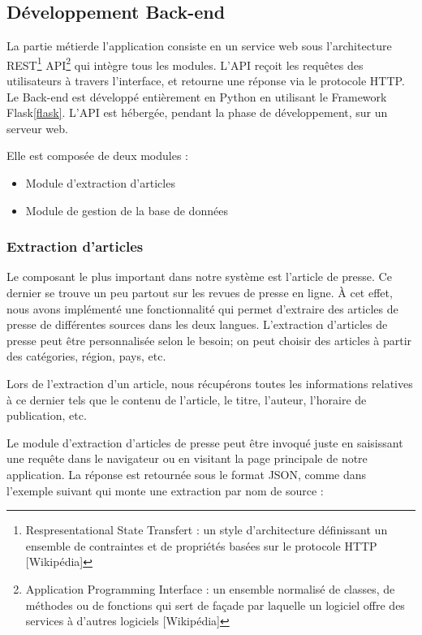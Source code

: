 \subsection{Développement Back-end}
La partie \textquotedbl métier\textquotedbl de l'application consiste en un service web sous l'architecture REST\footnote{Respresentational State Transfert : un style d'architecture définissant un ensemble de contraintes et de propriétés basées sur le protocole HTTP [Wikipédia]} API\footnote{Application Programming Interface : un ensemble normalisé de classes, de méthodes ou de fonctions qui sert de façade par laquelle un logiciel offre des services à d'autres logiciels [Wikipédia]} qui intègre tous les modules. L'API reçoit les requêtes des utilisateurs à travers l'interface, et retourne une réponse via le protocole HTTP. Le Back-end est développé entièrement en Python en utilisant le Framework Flask\autoref{flask}. L'API est hébergée, pendant la phase de développement, sur un serveur web. 

Elle est composée de deux modules :
\begin{itemize}
    \item Module d'extraction d'articles
    \item Module de gestion de la base de données
\end{itemize} 

\subsubsection{Extraction d'articles}
Le composant le plus important dans notre système est l'article de presse. Ce dernier se trouve un peu partout sur les revues de presse en ligne. À cet effet, nous avons implémenté une fonctionnalité qui permet d'extraire des articles de presse de différentes sources dans les deux langues. L'extraction d'articles de presse peut être personnalisée selon le besoin; on peut choisir des articles à partir des catégories, région, pays, etc.

Lors de l'extraction d'un article, nous récupérons toutes les informations relatives à ce dernier tels que le contenu de l'article, le titre, l'auteur, l'horaire de publication, etc.

Le module d'extraction d'articles de presse peut être invoqué juste en saisissant une requête dans le navigateur ou en visitant la page principale de notre application. La réponse est retournée sous le format JSON, comme dans l'exemple suivant qui monte une extraction par nom de source :

